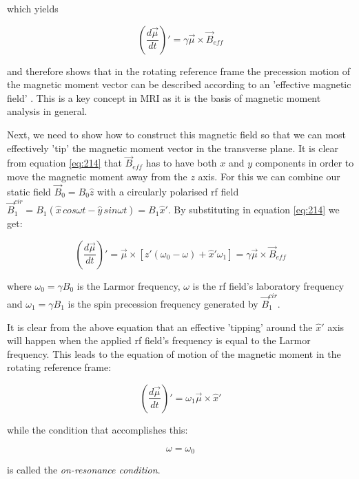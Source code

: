which yields 

\begin{equation} \label{eq:214}
    (\frac{d\vec{\mu}}{dt})' = \gamma \vec{\mu} \times \vec{B}_{eff}
\end{equation}

and therefore shows that in the rotating reference frame the precession motion of the magnetic moment vector can be described according to an 'effective magnetic field' \cite{Haacke1999}. This is a key concept in MRI as it is the basis of magnetic moment analysis in general.

Next, we need to show how to construct this magnetic field so that we can most effectively 'tip' the magnetic moment vector in the transverse plane. It is clear from equation \ref{eq:214} that $\vec{B}_{eff}$ has to have both $x$ and $y$ components in order to move the magnetic moment away from the $z$ axis. For this we can combine our static field $\vec{B}_0 = B_0 \hat{z}$ with a circularly polarised 
rf field $\vec{B}_1^{cir} = B_1(\hat{x} \, cos \omega t - \hat{y} \, sin \omega t) = B_1 \hat{x}'$. By substituting in equation \ref{eq:214} we get:

\begin{equation} \label{eq:215}
    (\frac{d\vec{\mu}}{dt})' = \vec{\mu} \times [\hat{z}'(\omega_0 - \omega) + \hat{x}' \omega_1] = \gamma \vec{\mu} \times \vec{B}_{eff}
\end{equation}

where $\omega_0 = \gamma B_0$ is the Larmor frequency, $\omega$ is the rf field's laboratory frequency and $\omega_1 = \gamma B_1$ is the spin precession frequency generated by $\vec{B}_1^{cir}$.

It is clear from the above equation that an effective 'tipping' around the $\hat{x}'$ axis will happen when the applied rf field's frequency is equal to the Larmor frequency. This leads to the equation of motion of the magnetic moment in the rotating reference frame:

\begin{equation} \label{eq:216}
    (\frac{d\vec{\mu}}{dt})' = \omega_1 \vec{\mu} \times \hat{x}'
\end{equation}

while the condition that accomplishes this:

\begin{equation} \label{eq:217}
    \omega = \omega_0    
\end{equation}

is called the \textit{on-resonance condition}.


